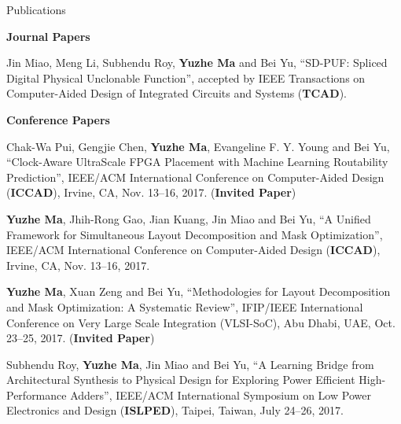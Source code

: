 \begin{rSection}{Publications}

\iffalse
\textbf{Books / Book Chapters}
\begin{description}[font=\normalfont]

\end{description}
\fi

\textbf{Journal Papers}
\begin{description}[font=\normalfont]
\item[{[J1]}]{
	Jin Miao, Meng Li, Subhendu Roy, \textbf{Yuzhe Ma} and Bei Yu, 
	``SD-PUF: Spliced Digital Physical Unclonable Function'', 
	accepted by IEEE Transactions on Computer-Aided Design of Integrated Circuits and Systems (\textbf{TCAD}).
}
\end{description}


\textbf{Conference Papers}
\begin{description}[font=\normalfont]
\item[{[C4]}]{
	Chak-Wa Pui, Gengjie Chen, \textbf{Yuzhe Ma}, Evangeline F. Y. Young and Bei Yu,
	``Clock-Aware UltraScale FPGA Placement with Machine Learning Routability Prediction'', 
	IEEE/ACM International Conference on Computer-Aided Design (\textbf{ICCAD}), Irvine, CA, Nov. 13--16, 2017.
	(\textbf{Invited Paper})
}

\item[{[C3]}]{
    \textbf{Yuzhe Ma}, Jhih-Rong Gao, Jian Kuang, Jin Miao and Bei Yu,
    ``A Unified Framework for Simultaneous Layout Decomposition and Mask Optimization'',
    IEEE/ACM International Conference on Computer-Aided Design (\textbf{ICCAD}), Irvine, CA, Nov. 13--16, 2017.
}

\item[{[C2]}]{
    \textbf{Yuzhe Ma}, Xuan Zeng and Bei Yu,
    ``Methodologies for Layout Decomposition and Mask Optimization: A Systematic Review'',
    IFIP/IEEE International Conference on Very Large Scale Integration (VLSI-SoC), Abu Dhabi, UAE, Oct. 23--25, 2017. (\textbf{Invited Paper})
}

\item[{[C1]}]{
    Subhendu Roy, \textbf{Yuzhe Ma}, Jin Miao and Bei Yu,
    ``A Learning Bridge from Architectural Synthesis to Physical Design for Exploring Power Efficient High-Performance Adders'',
    IEEE/ACM International Symposium on Low Power Electronics and Design (\textbf{ISLPED}), Taipei, Taiwan, July 24--26, 2017.
}

\end{description}



\end{rSection}
